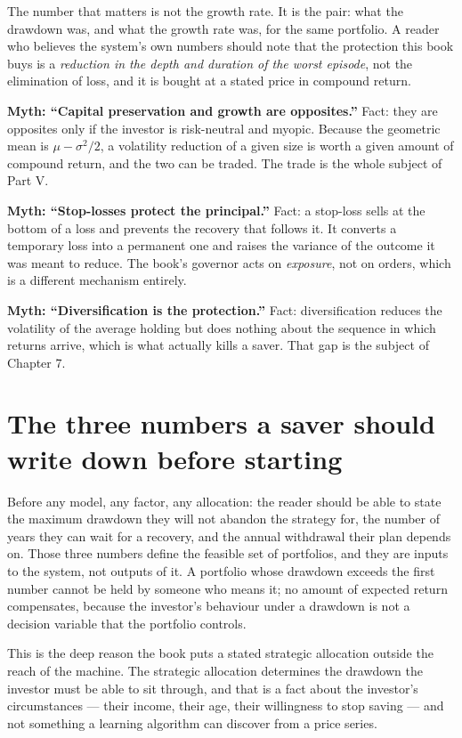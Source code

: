 The number that matters is not the growth rate. It is the pair: what the
drawdown was, and what the growth rate was, for the same portfolio. A
reader who believes the system's own numbers should note that the
protection this book buys is a \emph{reduction in the depth and duration of
the worst episode}, not the elimination of loss, and it is bought at a
stated price in compound return.

\begin{commonmyths}
\item \textbf{Myth: ``Capital preservation and growth are opposites.''}
Fact: they are opposites only if the investor is risk-neutral and
myopic. Because the geometric mean is \(\mu - \sigma^2/2\), a
volatility reduction of a given size is worth a given amount of compound
return, and the two can be traded. The trade is the whole subject of
Part V.
\item \textbf{Myth: ``Stop-losses protect the principal.''}
Fact: a stop-loss sells at the bottom of a loss and prevents the recovery
that follows it. It converts a temporary loss into a permanent one and
raises the variance of the outcome it was meant to reduce. The book's
governor acts on \emph{exposure}, not on orders, which is a different
mechanism entirely.
\item \textbf{Myth: ``Diversification is the protection.''}
Fact: diversification reduces the volatility of the average holding but
does nothing about the sequence in which returns arrive, which is what
actually kills a saver. That gap is the subject of Chapter 7.
\end{commonmyths}

\section{The three numbers a saver should write down before starting}

Before any model, any factor, any allocation: the reader should be able to
state the maximum drawdown they will not abandon the strategy for, the
number of years they can wait for a recovery, and the annual withdrawal
their plan depends on. Those three numbers define the feasible set of
portfolios, and they are inputs to the system, not outputs of it. A
portfolio whose drawdown exceeds the first number cannot be held by someone
who means it; no amount of expected return compensates, because the
investor's behaviour under a drawdown is not a decision variable that the
portfolio controls.

This is the deep reason the book puts a stated strategic allocation outside
the reach of the machine. The strategic allocation determines the drawdown
the investor must be able to sit through, and that is a fact about the
investor's circumstances --- their income, their age, their willingness to
stop saving --- and not something a learning algorithm can discover from a
price series.

